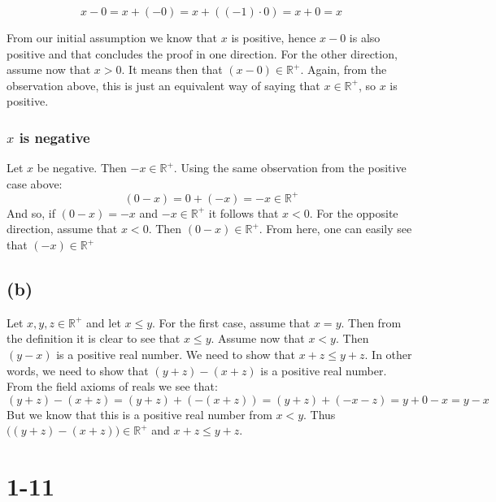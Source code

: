 \documentclass{article}
\begin{document}
\begin{equation*}
    x - 0 = x + (-0) = x + ((-1) \cdot 0) = x + 0 = x 
\end{equation*}

From our initial assumption we know that \(x\) is positive, hence \(x - 0\) is also positive and
that concludes the proof in one direction. For the other direction, assume now that \(x > 0\). It means then that
\((x - 0) \in \mathbb{R^{+}}\). Again, from the observation above, this is just an equivalent way of saying that
\(x \in \mathbb{R^{+}}\), so \(x\) is positive.

\subsubsection*{\(x\) is negative}

Let \(x\) be negative. Then \(-x \in \mathbb{R^{+}}\). Using the same observation from the positive case above:
\begin{equation*}
    (0 - x) = 0 + (-x) = -x \in \mathbb{R^{+}}
\end{equation*}
And so, if \((0 - x) = -x\) and \(-x \in \mathbb{R^{+}}\) it follows that \(x < 0\). For the opposite direction, assume that
\(x < 0\). Then \((0 - x) \in \mathbb{R^{+}}\). From here, one can easily see that \((-x) \in \mathbb{R^{+}}\)

\subsection*{(b)}

Let \(x, y, z \in \mathbb{R^{+}}\) and let \(x \leq y\). For the first case, assume that \(x = y\). Then from the definition it is clear
to see that \(x \leq y\). Assume now that \(x < y\). Then \((y - x) \) is a positive real number.  We need to show that \(x + z \leq y + z\). In other words, we need to show that
\((y + z) - (x + z)\) is a positive real number. From the field axioms of reals we see that:
\begin{equation*}
    (y + z) - (x + z) = (y + z) + (-(x + z)) = (y + z) + (-x - z) = y + 0 - x = y - x
\end{equation*} 
But we know that this is a positive real number from \(x < y\). Thus \( \Big((y + z) - (x + z)\Big) \in \mathbb{R^{+}}\) and \(x + z \leq y + z\).

\section*{1-11}
\end{document}
